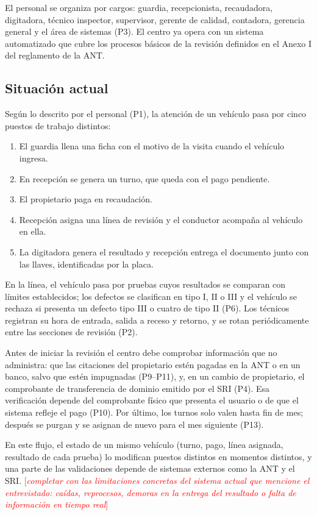 \documentclass[11pt,a4paper]{article}
\newcommand{\pendiente}[1]{\textcolor{red}{[\textit{#1}]}}
\begin{document}
El personal se organiza por cargos: guardia, recepcionista, recaudadora, digitadora, técnico inspector, supervisor, gerente de calidad, contadora, gerencia general y el área de sistemas (P3). El centro ya opera con un sistema automatizado que cubre los procesos básicos de la revisión definidos en el Anexo I del reglamento de la ANT.

\subsection{Situación actual}
Según lo descrito por el personal (P1), la atención de un vehículo pasa por cinco puestos de trabajo distintos:
\begin{enumerate}[nosep]
  \item El guardia llena una ficha con el motivo de la visita cuando el vehículo ingresa.
  \item En recepción se genera un turno, que queda con el pago pendiente.
  \item El propietario paga en recaudación.
  \item Recepción asigna una línea de revisión y el conductor acompaña al vehículo en ella.
  \item La digitadora genera el resultado y recepción entrega el documento junto con las llaves, identificadas por la placa.
\end{enumerate}

En la línea, el vehículo pasa por pruebas cuyos resultados se comparan con límites establecidos; los defectos se clasifican en tipo I, II o III y el vehículo se rechaza si presenta un defecto tipo III o cuatro de tipo II (P6). Los técnicos registran su hora de entrada, salida a receso y retorno, y se rotan periódicamente entre las secciones de revisión (P2).

Antes de iniciar la revisión el centro debe comprobar información que no administra: que las citaciones del propietario estén pagadas en la ANT o en un banco, salvo que estén impugnadas (P9--P11), y, en un cambio de propietario, el comprobante de transferencia de dominio emitido por el SRI (P4). Esa verificación depende del comprobante físico que presenta el usuario o de que el sistema refleje el pago (P10). Por último, los turnos solo valen hasta fin de mes; después se purgan y se asignan de nuevo para el mes siguiente (P13).

En este flujo, el estado de un mismo vehículo (turno, pago, línea asignada, resultado de cada prueba) lo modifican puestos distintos en momentos distintos, y una parte de las validaciones depende de sistemas externos como la ANT y el SRI. \pendiente{completar con las limitaciones concretas del sistema actual que mencione el entrevistado: caídas, reprocesos, demoras en la entrega del resultado o falta de información en tiempo real}
\end{document}
